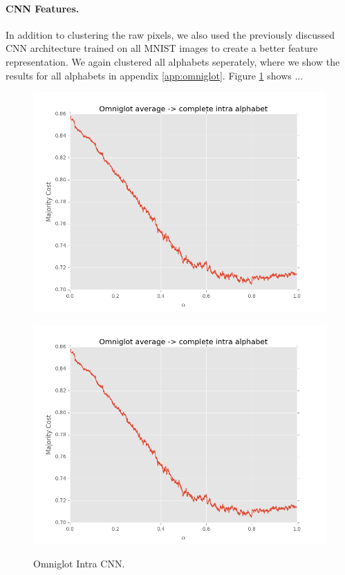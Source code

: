 
\paragraph{CNN Features.} In addition to clustering the raw pixels, we also used the previously discussed CNN architecture trained on all MNIST images to create a better feature representation. We again clustered all alphabets seperately, where we show the results for all alphabets in appendix \ref{app:omniglot}. Figure \ref{fig:omniglotintracnn} shows ...

\begin{figure}[h]
\centering
\begin{minipage}{.45\textwidth}
  \centering
  {\includegraphics[width=\linewidth]{plots/omniglot-ac-average.png}}
\end{minipage}\quad
\begin{minipage}{.45\textwidth}
  \centering
  {\includegraphics[width=\linewidth]{plots/omniglot-ac-average.png}}
\end{minipage}
\caption{%
  Omniglot Intra CNN.}
\label{fig:omniglotintracnn}
\end{figure}

